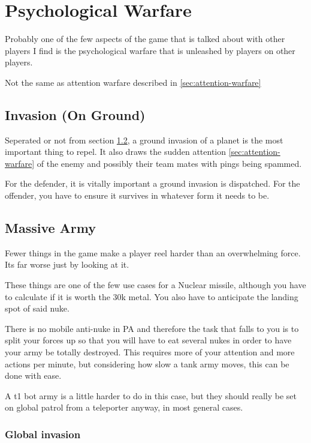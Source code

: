 \documentclass[]{article}
\begin{document}
\section{Psychological Warfare}\label{sec:psychological-warfare}

Probably one of the few aspects of the game that is talked about with other players I find is the psychological warfare that is unleashed by players on other players.  

Not the same as attention warfare described in \ref{sec:attention-warfare}

\subsection{Invasion (On Ground)}

Seperated or not from section \ref{sec:massive-army}, a ground invasion of a planet is the most important thing to repel.  It also draws the sudden attention \ref{sec:attention-warfare} of the enemy and possibly their team mates with pings being spammed.  

For the defender, it is vitally important a ground invasion is dispatched.  For the offender, you have to ensure it survives in whatever form it needs to be.  




\subsection{Massive Army}\label{sec:massive-army}

Fewer things in the game make a player reel harder than an overwhelming force. Its far worse just by looking at it.  

These things are one of the few use cases for a Nuclear missile, although you have to calculate if it is worth the 30k metal.  You also have to anticipate the landing spot of said nuke.  

There is no mobile anti-nuke in PA and therefore the task that falls to you is to split your forces up so that you will have to eat several nukes in order to have your army be totally destroyed.  This requires more of your attention and more actions per minute, but considering how slow a tank army moves, this can be done with ease.  

A t1 bot army is a little harder to do in this case, but they should really be set on global patrol from a teleporter anyway, in most general cases.  

\subsubsection{Global invasion}
\end{document}
